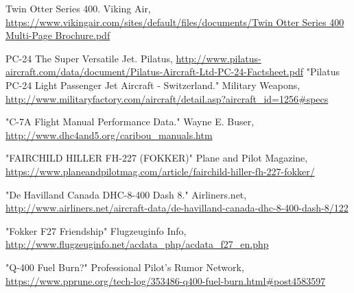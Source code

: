 \documentclass[conf]{new-aiaa}
\begin{document}
\begin{thebibliography}{99}
 Twin Otter Series 400. Viking Air, 
    \url{https://www.vikingair.com/sites/default/files/documents/Twin Otter Series 400 Multi-Page Brochure.pdf}

 PC-24 The Super Versatile Jet. Pilatus, 
        \url{http://www.pilatus-aircraft.com/data/document/Pilatus-Aircraft-Ltd-PC-24-Factsheet.pdf}
 "Pilatus PC-24 Light Passenger Jet Aircraft - Switzerland." Military Weapons, 
    \url{http://www.militaryfactory.com/aircraft/detail.asp?aircraft_id=1256#specs}

 "C-7A Flight Manual Performance Data." Wayne E. Buser, 
    \url{http://www.dhc4and5.org/caribou_manuals.htm}

 "FAIRCHILD HILLER FH-227 (FOKKER)" Plane and Pilot Magazine, 
    \url{https://www.planeandpilotmag.com/article/fairchild-hiller-fh-227-fokker/}

 "De Havilland Canada DHC-8-400 Dash 8." Airliners.net, 
    \url{http://www.airliners.net/aircraft-data/de-havilland-canada-dhc-8-400-dash-8/122}

 "Fokker F27 Friendship" Flugzeuginfo Info,
    \url{http://www.flugzeuginfo.net/acdata_php/acdata_f27_en.php}

 "Q-400 Fuel Burn?" Professional Pilot's Rumor Network,
    \url{https://www.pprune.org/tech-log/353486-q400-fuel-burn.html#post4583597}


\end{thebibliography}
\end{document}
